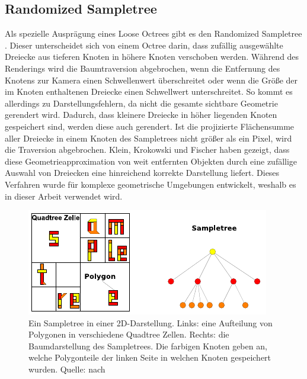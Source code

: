 \subsection{Randomized Sampletree}
\label{sec:basics:sampletree}
Als spezielle Ausprägung eines Loose Octrees gibt es den Randomized Sampletree \cite{klein}. Dieser unterscheidet sich von einem Octree darin, dass zufällig ausgewählte Dreiecke aus tieferen Knoten in höhere Knoten verschoben werden. Während des Renderings wird die Baumtraversion abgebrochen, wenn die Entfernung des Knotens zur Kamera einen Schwellenwert überschreitet oder wenn die Größe der im Knoten enthaltenen Dreiecke einen Schwellwert unterschreitet. So kommt es allerdings zu Darstellungsfehlern, da nicht die gesamte sichtbare Geometrie gerendert wird. Dadurch, dass kleinere Dreiecke in höher liegenden Knoten gespeichert sind, werden diese auch gerendert. Ist die projizierte Flächensumme aller Dreiecke in einem Knoten des Sampletrees nicht größer als ein Pixel, wird die Traversion abgebrochen. Klein, Krokowski und Fischer \cite{klein} haben gezeigt, dass diese Geometrieapproximation von weit entfernten Objekten durch eine zufällige Auswahl von Dreiecken eine hinreichend korrekte Darstellung liefert. Dieses Verfahren wurde für komplexe geometrische Umgebungen entwickelt, weshalb es in dieser Arbeit verwendet wird.
\begin{figure}
 \centering
  \includegraphics[scale=1.7]{images/sampletree2.pdf}
  \caption{Ein Sampletree in einer 2D-Darstellung. Links: eine Aufteilung von Polygonen in verschiedene Quadtree Zellen. Rechts: die Baumdarstellung des Sampletrees. Die farbigen Knoten geben an, welche Polygonteile der linken Seite in welchen Knoten gespeichert wurden. Quelle: nach \cite{klein}}
 \label{fig:basics:sampletree}
\end{figure}

